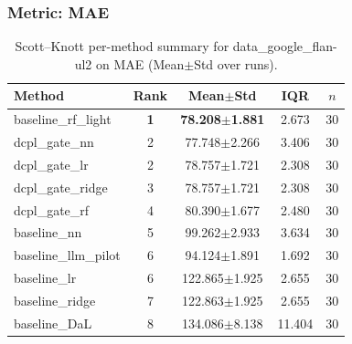 \subsubsection*{Metric: MAE}
\begin{table}[H]
\centering
\scriptsize
\setlength{\tabcolsep}{4pt}
\renewcommand{\arraystretch}{1.1}
\caption{Scott--Knott per-method summary for data\_google\_flan-ul2 on MAE (Mean$\pm$Std over runs).}
\label{tab:sk_data_google_flan-ul2_MAE}
\begin{tabular}{l|c|c|c|c}
\hline
\textbf{Method} & \textbf{Rank} & \textbf{Mean$\pm$Std} & \textbf{IQR} & \textbf{$n$} \\
\hline
\rowcolor{red!15} baseline\_rf\_light & \textbf{1} & \textbf{78.208$\pm$1.881} & 2.673 & 30 \\
dcpl\_gate\_nn & 2 & 77.748$\pm$2.266 & 3.406 & 30 \\
dcpl\_gate\_lr & 2 & 78.757$\pm$1.721 & 2.308 & 30 \\
dcpl\_gate\_ridge & 3 & 78.757$\pm$1.721 & 2.308 & 30 \\
dcpl\_gate\_rf & 4 & 80.390$\pm$1.677 & 2.480 & 30 \\
baseline\_nn & 5 & 99.262$\pm$2.933 & 3.634 & 30 \\
baseline\_llm\_pilot & 6 & 94.124$\pm$1.891 & 1.692 & 30 \\
baseline\_lr & 6 & 122.865$\pm$1.925 & 2.655 & 30 \\
baseline\_ridge & 7 & 122.863$\pm$1.925 & 2.655 & 30 \\
baseline\_DaL & 8 & 134.086$\pm$8.138 & 11.404 & 30 \\
\hline
\end{tabular}
\end{table}

